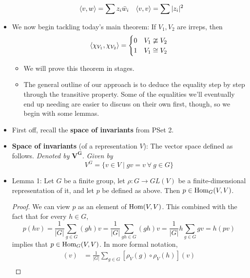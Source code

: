 \documentclass[../notes.tex]{subfiles}
\begin{document}
\begin{itemize}
\begin{itemize}
\begin{align*}
            \left\langle{v,w}\right\rangle &= \sum z_i\bar{w}_i&
            \left\langle{v,v}\right\rangle &= \sum|z_i|^2
        \end{align*}
    \end{itemize}
    \item We now begin tackling today's main theorem: If $V_1,V_2$ are irreps, then
    \begin{equation*}
        \left\langle{\chi_{V_1},\chi_{V_2}}\right\rangle =
        \begin{cases}
            0 & V_1\ncong V_2\\
            1 & V_1\cong V_2
        \end{cases}
    \end{equation*}
    \begin{itemize}
        \item We will prove this theorem in stages.
        \item The general outline of our approach is to deduce the equality step by step through the transitive property. Some of the equalities we'll eventually end up needing are easier to discuss on their own first, though, so we begin with some lemmas.
    \end{itemize}
    \item First off, recall the \textbf{space of invariants} from PSet 2.
    \item \textbf{Space of invariants} (of a representation $V$): The vector space defined as follows. \emph{Denoted by} $\bm{V^G}$. \emph{Given by}
    \begin{equation*}
        V^G = \{v\in V\mid gv=v\ \forall\ g\in G\}
    \end{equation*}
    \item Lemma 1: Let $G$ be a finite group, let $\rho:G\to GL(V)$ be a finite-dimensional representation of it, and let $p$ be defined as above. Then $p\in\operatorname{Hom}_G(V,V)$.
    \begin{proof}
        We can view $p$ as an element of $\operatorname{Hom}(V,V)$. This combined with the fact that for every $h\in G$,
        \begin{equation*}
            p(hv) = \frac{1}{|G|}\sum_{g\in G}(gh)v
            = \frac{1}{|G|}\sum_{gh\in G}(gh)v
            = \frac{1}{|G|}h\sum_{g\in G}gv
            = h(pv)
        \end{equation*}
        implies that $p\in\operatorname{Hom}_G(V,V)$. In more formal notation,
        \begin{align*}
            [p\circ\rho_V(h)](v) &= \frac{1}{|G|}\sum_{g\in G}[\rho_V(g)\circ\rho_V(h)](v)\\

\end{align*}
\end{proof}
\end{itemize}
\end{document}
